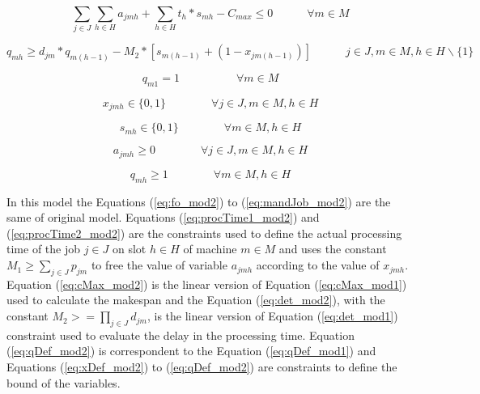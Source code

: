 \documentclass[a4paper,11pt]{article}
\begin{document}
\begin{equation}\label{eq:cMax_mod2}
	\sum_{j \in J}\sum_{h \in H} a_{jmh} + \sum_{h \in H} t_h*s_{mh} - C_{max} \leq 0 \quad \quad \quad \forall m \in M
\end{equation}

\begin{equation}\label{eq:det_mod2}
q_{mh} \geq d_{jm}*q_{m(h-1)} - M_2*[s_{m(h-1)}+(1-x_{jm(h-1)})]    \quad \quad \quad j \in J, m \in M, h \in H\backslash\{1\}
\end{equation}

\begin{equation}\label{eq:qInit_mod2}
q_{m1} = 1 \quad\quad\quad\quad\quad \forall m \in M
\end{equation}

\begin{equation}\label{eq:xDef_mod2}
    x_{jmh} \in \{0,1\} \quad \quad \quad \quad \forall j \in J, m \in M, h \in H
\end{equation}

\begin{equation}\label{eq:dDef_mod2}
    s_{mh} \in \{0,1\} \quad \quad \quad \quad \forall m \in M, h \in H
\end{equation}

\begin{equation}\label{eq:aDef_mod2}
    a_{jmh} \geq 0 \quad \quad \quad \quad \forall j \in J, m \in M, h \in H
\end{equation}

\begin{equation}\label{eq:qDef_mod2}
    q_{mh} \geq 1 \quad \quad \quad \quad \forall  m \in M, h \in H
\end{equation}

In this model the Equations (\ref{eq:fo_mod2}) to (\ref{eq:mandJob_mod2}) are the same of original model. Equations (\ref{eq:procTime1_mod2}) and (\ref{eq:procTime2_mod2}) are the constraints used to define the actual processing time of the job $j \in J$ on slot $h \in H$ of machine $m \in M$ and uses the constant $M_1 \geq \sum_{j \in J}{p_{jm}}$ to free the value of variable $a_{jmh}$ according to the value of $x_{jmh}$. Equation (\ref{eq:cMax_mod2}) is the linear version of Equation (\ref{eq:cMax_mod1}) used to calculate the makespan and the Equation (\ref{eq:det_mod2}), with the constant $M_2 >= \prod_{j \in J}{d_{jm}}$, is the linear version of Equation (\ref{eq:det_mod1}) constraint used to evaluate the delay in the processing time. Equation (\ref{eq:qDef_mod2}) is correspondent to the Equation (\ref{eq:qDef_mod1}) and Equations (\ref{eq:xDef_mod2}) to (\ref{eq:qDef_mod2}) are constraints to define the bound of the variables.
\end{document}
